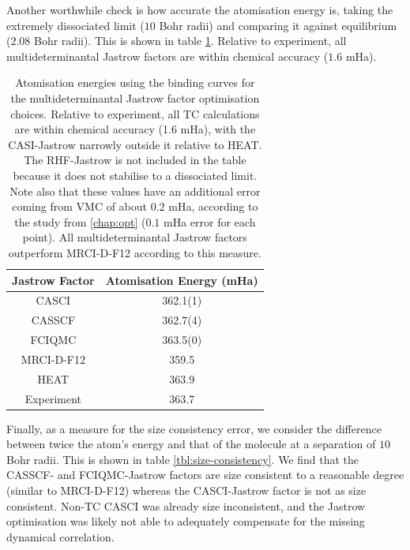 Another worthwhile check is how accurate the atomisation energy is, taking the extremely dissociated limit ($10$ Bohr radii) and comparing it against equilibrium ($2.08$ Bohr radii). This is shown in table \ref{tbl:binding-atomisation-energies}. Relative to experiment, all multideterminantal Jastrow factors are within chemical accuracy ($1.6$ mHa).

\begin{table}[!h]
    \centering
        \begin{tabular}{c|c}
            Jastrow Factor & Atomisation Energy (mHa) \\
            \hline
            CASCI & 362.1(1) \\
            CASSCF & 362.7(4) \\
            FCIQMC & 363.5(0) \\
            \bottomrule
            MRCI-D-F12 & 359.5 \\
            HEAT\supercite{fellerSurvey2008} & 363.9 \\
            Experiment\supercite{leroyAccurate2006} & 363.7
        \end{tabular}
    \caption{Atomisation energies using the binding curves for the multideterminantal Jastrow factor optimisation choices. Relative to experiment, all TC calculations are within chemical accuracy (1.6 mHa), with the CASI-Jastrow narrowly outside it relative to HEAT. The RHF-Jastrow is not included in the table because it does not stabilise to a dissociated limit. Note also that these values have an additional error coming from VMC of about $0.2$ mHa, according to the study from \autoref{chap:opt} ($0.1$ mHa error for each point). All multideterminantal Jastrow factors outperform MRCI-D-F12 according to this measure.}
    \label{tbl:binding-atomisation-energies}
\end{table}

Finally, as a measure for the size consistency error, we consider the difference between twice the atom's energy and that of the molecule at a separation of $10$ Bohr radii. This is shown in table \ref{tbl:size-consistency}. We find that the CASSCF- and FCIQMC-Jastrow factors are size consistent to a reasonable degree (similar to MRCI-D-F12) whereas the CASCI-Jastrow factor is not as size consistent. Non-TC CASCI was already size inconsistent, and the Jastrow optimisation was likely not able to adequately compensate for the missing dynamical correlation.

